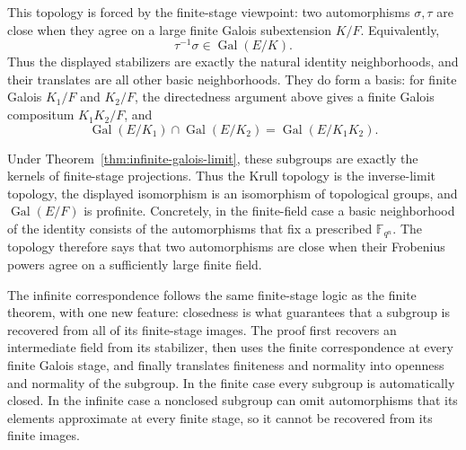 This topology is forced by the finite-stage viewpoint: two automorphisms
\(\sigma,\tau\) are close when they agree on a large finite Galois
subextension \(K/F\).  Equivalently,
\[
\tau^{-1}\sigma\in\operatorname{Gal}(E/K).
\]
Thus the displayed stabilizers are exactly the natural identity
neighborhoods, and their translates are all other basic neighborhoods.
They do form a basis: for finite Galois \(K_1/F\) and \(K_2/F\), the
directedness argument above gives a finite Galois compositum \(K_1K_2/F\),
and
\[
\operatorname{Gal}(E/K_1)\cap\operatorname{Gal}(E/K_2)
=\operatorname{Gal}(E/K_1K_2).
\]

Under Theorem~\ref{thm:infinite-galois-limit}, these subgroups are exactly the
kernels of finite-stage projections.  Thus the Krull topology is the
inverse-limit topology, the displayed isomorphism is an isomorphism of
topological groups, and \(\operatorname{Gal}(E/F)\) is profinite.
Concretely, in the finite-field case a basic neighborhood of the identity
consists of the automorphisms that fix a prescribed
\(\mathbb F_{q^n}\).  The topology therefore says that two automorphisms are
close when their Frobenius powers agree on a sufficiently large finite field.

The infinite correspondence follows the same finite-stage logic as the
finite theorem, with one new feature: closedness is what guarantees that a
subgroup is recovered from all of its finite-stage images.  The proof
first recovers an intermediate field from its stabilizer, then uses the
finite correspondence at every finite Galois stage, and finally translates
finiteness and normality into openness and normality of the subgroup.
In the finite case every subgroup is automatically closed.  In the infinite
case a nonclosed subgroup can omit automorphisms that its elements approximate
at every finite stage, so it cannot be recovered from its finite images.

